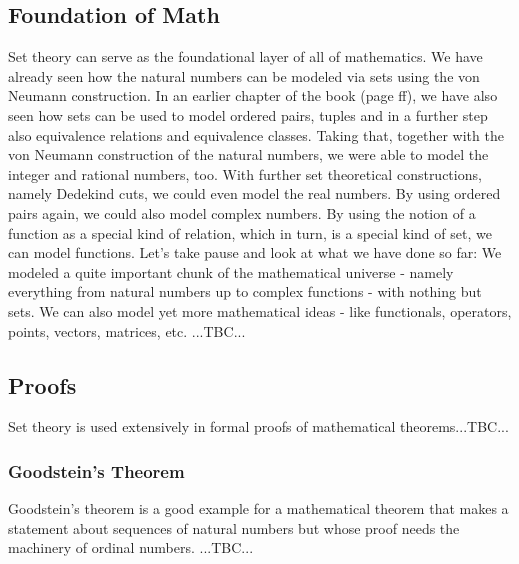 \subsection{Foundation of Math}
Set theory can serve as the foundational layer of all of mathematics. We have already seen how the natural numbers can be modeled via sets using the von Neumann construction. In an earlier chapter of the book (page \pageref{Sec:NaiveSetTheory} ff), we have also seen how sets can be used to model ordered pairs, tuples and in a further step also equivalence relations and equivalence classes. Taking that, together with the von Neumann construction of the natural numbers, we were able to model the integer and rational numbers, too. With further set theoretical constructions, namely Dedekind cuts, we could even model the real numbers. By using ordered pairs again, we could also model complex numbers. By using the notion of a function as a special kind of relation, which in turn, is a special kind of set, we can model functions. Let's take pause and look at what we have done so far: We modeled a quite important chunk of the mathematical universe - namely everything from natural numbers up to complex functions - with nothing but sets. We can also model yet more mathematical ideas - like functionals, operators, points, vectors, matrices, etc. ...TBC...







\subsection{Proofs}
Set theory is used extensively in formal proofs of mathematical theorems...TBC...

\subsubsection{Goodstein's Theorem}
Goodstein's theorem is a good example for a mathematical theorem that makes a statement about sequences of natural numbers but whose proof needs the machinery of ordinal numbers. ...TBC...


